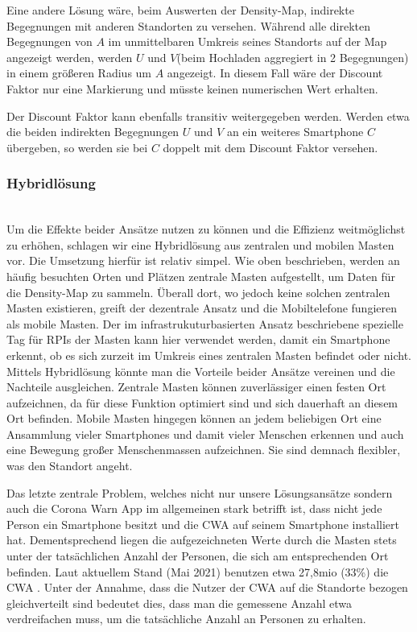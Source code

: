 \documentclass[conference,compsoc]{IEEEtran}
\begin{document}
Eine andere Lösung wäre, beim Auswerten der Density-Map, indirekte Begegnungen mit anderen Standorten zu versehen. 
Während alle direkten Begegnungen von $A$ im unmittelbaren Umkreis seines Standorts auf der Map angezeigt werden,
werden $U$ und $V$(beim Hochladen aggregiert in 2 Begegnungen) in einem größeren Radius um $A$ angezeigt.
In diesem Fall wäre der Discount Faktor nur eine Markierung und müsste keinen numerischen Wert erhalten. 

Der Discount Faktor kann ebenfalls transitiv weitergegeben werden. 
Werden etwa die beiden indirekten Begegnungen $U$ und $V$ an ein weiteres Smartphone $C$ übergeben, so werden sie bei $C$ doppelt mit dem Discount Faktor versehen.\\

\subsubsection{Hybridlösung}
\text{ }\\
Um die Effekte beider Ansätze nutzen zu können und die Effizienz weitmöglichst zu erhöhen, schlagen wir eine Hybridlösung aus zentralen und mobilen Masten vor. 
Die Umsetzung hierfür ist relativ simpel. 
Wie oben beschrieben, werden an häufig besuchten Orten und Plätzen zentrale Masten aufgestellt, um Daten für die Density-Map zu sammeln. 
Überall dort, wo jedoch keine solchen zentralen Masten existieren, greift der dezentrale Ansatz und die Mobiltelefone fungieren als mobile Masten. 
Der im infrastrukuturbasierten Ansatz beschriebene spezielle Tag für RPIs der Masten kann hier verwendet werden, damit ein Smartphone erkennt, 
ob es sich zurzeit im Umkreis eines zentralen Masten befindet oder nicht. 
Mittels Hybridlösung könnte man die Vorteile beider Ansätze vereinen und die Nachteile ausgleichen. 
Zentrale Masten können zuverlässiger einen festen Ort aufzeichnen, da für diese Funktion optimiert sind und sich dauerhaft an diesem Ort befinden.
Mobile Masten hingegen können an jedem beliebigen Ort eine Ansammlung vieler Smartphones und damit vieler Menschen erkennen und auch eine Bewegung großer Menschenmassen aufzeichnen.
Sie sind demnach flexibler, was den Standort angeht.

Das letzte zentrale Problem, welches nicht nur unsere Lösungsansätze sondern auch die Corona Warn App im allgemeinen stark betrifft ist, 
dass nicht jede Person ein Smartphone besitzt und die CWA auf seinem Smartphone installiert hat. 
Dementsprechend liegen die aufgezeichneten Werte durch die Masten stets unter der tatsächlichen Anzahl der Personen, die sich am entsprechenden Ort befinden. 
Laut aktuellem Stand (Mai 2021) benutzen etwa 27,8mio (33\%) die CWA \cite{Downloads}.
Unter der Annahme, dass die Nutzer der CWA auf die Standorte bezogen gleichverteilt sind bedeutet dies, 
dass man die gemessene Anzahl etwa verdreifachen muss, um die tatsächliche Anzahl an Personen zu erhalten.
\end{document}
